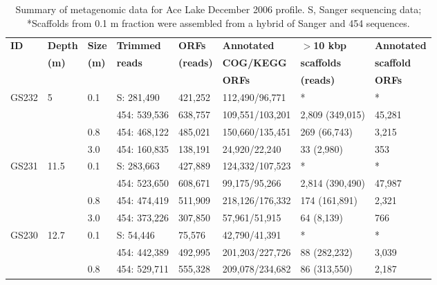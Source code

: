 \begin{table}
\footnotesize
\caption[Summary of metagenomic data for Ace Lake profile]{Summary of metagenomic data for Ace Lake December 2006 profile. S, Sanger sequencing data; *Scaffolds from 0.1 \textmu{}m fraction were assembled from a hybrid of Sanger and 454 sequences.}
\label{tab:ace_metag}
\smallskip
\begin{tabularx}{\textwidth}{p{0.6cm}p{0.7cm}p{0.5cm}p{1.8cm}p{1cm}Xp{2.4cm}p{1.4cm}}
\toprule
\textbf{ID} & \textbf{Depth} & \textbf{Size}         & \textbf{Trimmed}      & \textbf{\acp{ORF}} & \textbf{Annotated}            & \textbf{$>$10 kbp} & \textbf{Annotated} \\
            & \textbf{(m)}   & \textbf{(\textmu{}m)} & \textbf{reads}        & \textbf{(reads)}   & \textbf{\acs{COG}/\acs{KEGG}} & \textbf{scaffolds} & \textbf{scaffold} \\
            &                &                       &                       &                    & \textbf{\acp{ORF}}            & \textbf{(reads)}   & \textbf{\acp{ORF}} \\
\midrule
GS232 & 5    & 0.1 & S: 281,490 & 421,252 & 112,490/96,771   & *               & *      \\
      &      &     & 454: 539,536    & 638,757 & 109,551/103,201  & 2,809 (349,015) & 45,281 \\
      &      & 0.8 & 454: 468,122    & 485,021 & 150,660/135,451  & 269 (66,743)    & 3,215  \\
      &      & 3.0 & 454: 160,835    & 138,191 & 24,920/22,240    & 33 (2,980)      & 353    \\ 
GS231 & 11.5 & 0.1 & S: 283,663 & 427,889 & 124,332/107,523  & *               & *      \\
      &      &     & 454: 523,650    & 608,671 & 99,175/95,266    & 2,814 (390,490) & 47,987 \\
      &      & 0.8 & 454: 474,419    & 511,909 & 218,126/176,332  & 174 (161,891)   & 2,321  \\
      &      & 3.0 & 454: 373,226    & 307,850 & 57,961/51,915    & 64 (8,139)      & 766    \\ 
GS230 & 12.7 & 0.1 & S: 54,446  & 75,576  & 42,790/41,391    & *               & *      \\
      &      &     & 454: 442,389    & 492,995 & 201,203/227,726  & 88 (282,232)    & 3,039  \\
      &      & 0.8 & 454: 529,711    & 555,328 & 209,078/234,682  & 86 (313,550)    & 2,187  \\

\end{tabularx}
\end{table}
